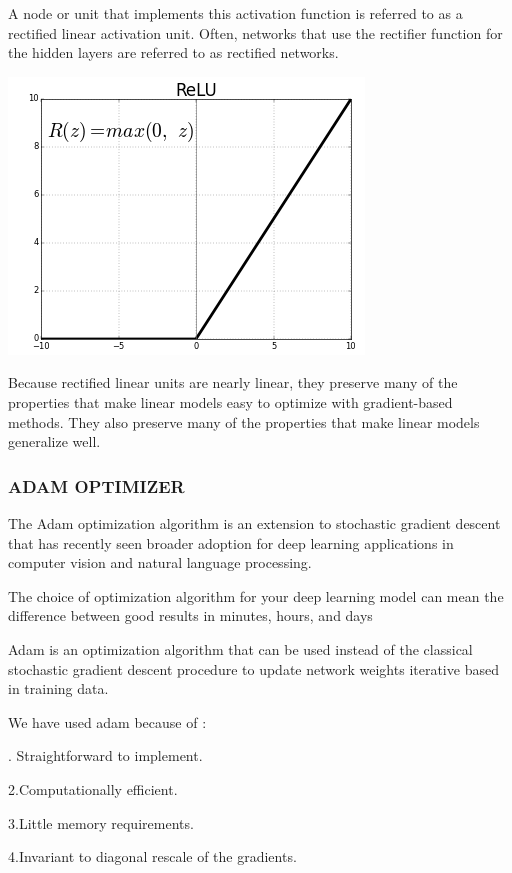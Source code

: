 \documentclass[12pt]{article}
\newcommand{\nd}{\noindent}
\begin{document}
\nd A node or unit that implements this activation function is referred to as a rectified linear activation unit. Often, networks that use the rectifier function for the hidden layers are referred to as rectified networks.

\begin{center}
\centerline{\includegraphics[scale=.7]{relu.png}}
\end{center}

\nd Because rectified linear units are nearly linear, they preserve many of the properties that make linear models easy to optimize with gradient-based methods. They also preserve many of the properties that make linear models generalize well.
\newpage
\subsubsection{\textbf{ADAM OPTIMIZER}}
The Adam optimization algorithm is an extension to stochastic gradient descent that has recently seen broader adoption for deep learning applications in computer vision and natural language processing.

\nd The choice of optimization algorithm for your deep learning model can mean the difference between good results in minutes, hours, and days

\nd Adam is an optimization algorithm that can be used instead of the classical stochastic gradient descent procedure to update network weights iterative based in training data.

\nd We have used adam because of : 

\nd 1. Straightforward to implement.

\nd 2.Computationally efficient.

\nd 3.Little memory requirements.

\nd 4.Invariant to diagonal rescale of the gradients.
\end{document}
